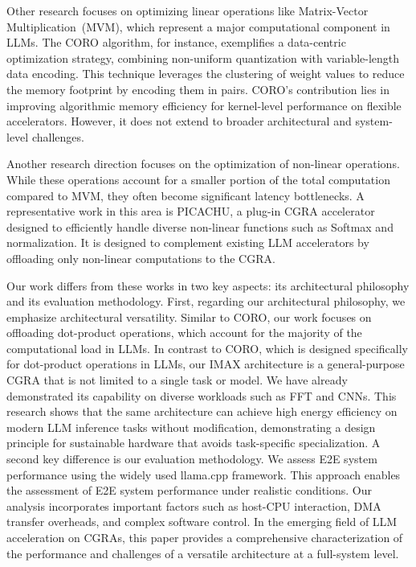 Other research focuses on optimizing linear operations like Matrix-Vector Multiplication~(MVM), which represent a major computational component in LLMs. 
The CORO algorithm\nobreak\cite{coro}, for instance, exemplifies a data-centric optimization strategy, combining non-uniform quantization with variable-length data encoding. 
This technique leverages the clustering of weight values to reduce the memory footprint by encoding them in pairs. 
CORO's contribution lies in improving algorithmic memory efficiency for kernel-level performance on flexible accelerators. 
However, it does not extend to broader architectural and system-level challenges.

Another research direction focuses on the optimization of non-linear operations. 
While these operations account for a smaller portion of the total computation compared to MVM, they often become significant latency bottlenecks. 
A representative work in this area is PICACHU\nobreak\cite{picachu}, a plug-in CGRA accelerator designed to efficiently handle diverse non-linear functions such as Softmax and normalization. 
It is designed to complement existing LLM accelerators by offloading only non-linear computations to the CGRA.


Our work differs from these works in two key aspects: its architectural philosophy and its evaluation methodology. 
First, regarding our architectural philosophy, we emphasize architectural versatility. 
Similar to CORO, our work focuses on offloading dot-product operations, which account for the majority of the computational load in LLMs. 
In contrast to CORO, which is designed specifically for dot-product operations in LLMs, our IMAX architecture is a general-purpose CGRA that is not limited to a single task or model.
We have already demonstrated its capability on diverse workloads such as FFT\nobreak\cite{imax3} and CNNs\nobreak\cite{cnn_imax_1,cnn_imax_2}.
This research shows that the same architecture can achieve high energy efficiency on modern LLM inference tasks without modification, demonstrating a design principle for sustainable hardware that avoids task-specific specialization.
A second key difference is our evaluation methodology. 
We assess E2E system performance using the widely used llama.cpp framework. 
This approach enables the assessment of E2E system performance under realistic conditions. 
Our analysis incorporates important factors such as host-CPU interaction, DMA transfer overheads, and complex software control. 
In the emerging field of LLM acceleration on CGRAs, this paper provides a comprehensive characterization of the performance and challenges of a versatile architecture at a full-system level.




